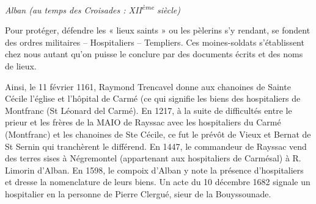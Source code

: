 
\begin{center}
    {\Large\itshape Alban (au temps des Croisades : XII\textsuperscript{ème} siècle)}
\end{center}

\vspace{1em}

Pour protéger, défendre les « lieux saints » ou les pèlerins s'y
rendant, se fondent des ordres militaires -- Hospitaliers --
Templiers. Ces moines-soldats s'établissent chez nous autant qu'on
puisse le conclure par des documents écrits et des noms de lieux.

\vspace{1em}

Ainsi, le 11 février 1161, Raymond Trencavel donne aux chanoines
de Sainte Cécile l'église et l'hôpital de Carmé (ce qui signifie
les biens des hospitaliers de Montfranc (St Léonard del Carmé).
En 1217, à la suite de difficultés entre le prieur et les frères
de la MAIO de Rayssac avec les hospitaliers du Carmé (Montfranc)
et les chanoines de Ste Cécile, ce fut le prévôt de Vieux et
Bernat de St Sernin qui tranchèrent le différend. En 1447, le
commandeur de Rayssac vend des terres sises à Négremontel
(appartenant aux hospitaliers de Carmésal) à R. Limorin d'Alban.
En 1598, le compoix d'Alban y note la présence d'hospitaliers et
dresse la nomenclature de leurs biens. Un acte du 10 décembre
1682 signale un hospitalier en la personne de Pierre Clergué,
sieur de la Bouyssounade.
